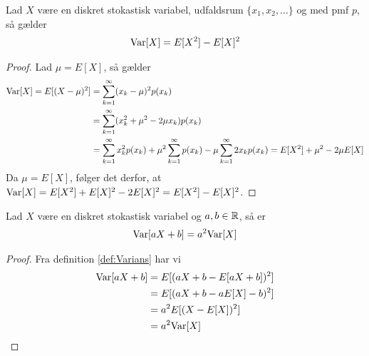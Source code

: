 \begin{cor} \label{cor:VariansIForholdTilForventedVærdi} %
    Lad $X$ være en diskret stokastisk variabel, udfaldsrum $\{x_1, x_2, \ldots\}$ og med pmf $p$, så gælder
    \begin{align*}
      \textnormal{Var}[X]=E[X^2]-E[X]^2
    \end{align*}
\end{cor}
\begin{proof}
    Lad $\mu = E[X]$, så gælder
    \begin{align*}
        \textnormal{Var}[X] = E[(X - \mu)^2] &= \sum^\infty_{k = 1} (x_k - \mu)^2 p(x_k)\\
        &= \sum^\infty_{k = 1} (x_k^2 + \mu^2 - 2\mu x_k)p(x_k) \\
        &= \sum^\infty_{k = 1} x_k^2 p(x_k) + \mu^2 \sum^\infty_{k = 1} p(x_k) - \mu \sum^\infty_{k = 1} 2x_k p(x_k) = E[X^2] + \mu^2 - 2\mu E[X]
    \end{align*}
    Da $\mu = E[X]$, følger det derfor, at $\textnormal{Var}[X] = E[X^2] + E[X]^2 - 2E[X]^2 = E[X^2] - E[X]^2$.
\end{proof}




\begin{prop} %
Lad $X$ være en diskret stokastisk variabel og $a, b\in \mathbb{R}$, så er
\begin{align*}
    \textnormal{Var}[aX+b]=a^2\textnormal{Var}[X]
\end{align*}
\end{prop}
\begin{proof}
Fra definition \ref{def:Varians} har vi
    \begin{align*}
        \textnormal{Var}[aX+b]&=E[(aX+b-E[aX+b])^2]\\
        &=E[(aX+b-aE[X]-b)^2]\\
        &=a^2E[(X-E[X])^2]\\
        &=a^2\textnormal{Var}[X]
    \end{align*}
\end{proof}